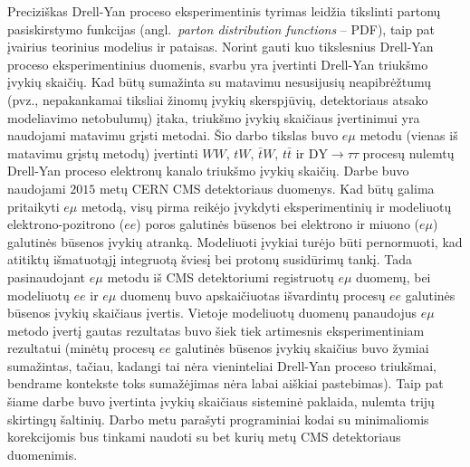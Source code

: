 \documentclass[a4paper, 12pt]{article}
\newcommand{\WW}{W\! W}
\newcommand{\DYtau}{\mathrm{DY} \! \rightarrow \! \tau\tau}
\begin{document}
Preciziškas Drell-Yan proceso eksperimentinis tyrimas leidžia tikslinti partonų pasiskirstymo funkcijas (angl.\ \textit{parton distribution functions} -- PDF), taip pat įvairius teorinius modelius ir pataisas. Norint gauti kuo tikslesnius Drell-Yan proceso eksperimentinius duomenis, svarbu yra įvertinti Drell-Yan triukšmo įvykių skaičių. Kad būtų sumažinta su matavimu nesusijusių neapibrėžtumų (pvz., nepakankamai tiksliai žinomų įvykių skerspjūvių, detektoriaus atsako modeliavimo netobulumų) įtaka, triukšmo įvykių skaičiaus įvertinimui yra naudojami matavimu grįsti metodai. Šio darbo tikslas buvo $e\mu$ metodu (vienas iš matavimu grįstų metodų) įvertinti $\WW$, $tW$, $\bar{t}W$, $t\bar{t}$ ir $\DYtau$ procesų nulemtų Drell-Yan proceso elektronų kanalo triukšmo įvykių skaičių. Darbe buvo naudojami $2015$ metų CERN CMS detektoriaus duomenys. Kad būtų galima pritaikyti $e\mu$ metodą, visų pirma reikėjo įvykdyti eksperimentinių ir modeliuotų elektrono-pozitrono ($ee$) poros galutinės būsenos bei elektrono ir miuono ($e\mu$) galutinės būsenos įvykių atranką. Modeliuoti įvykiai turėjo būti pernormuoti, kad atitiktų išmatuotąjį integruotą šviesį bei protonų susidūrimų tankį. Tada pasinaudojant $e\mu$ metodu iš CMS detektoriumi registruotų $e\mu$ duomenų, bei modeliuotų $ee$ ir $e\mu$ duomenų buvo apskaičiuotas išvardintų procesų $ee$ galutinės būsenos įvykių skaičiaus įvertis. Vietoje modeliuotų duomenų panaudojus $e\mu$ metodo įvertį gautas rezultatas buvo šiek tiek artimesnis eksperimentiniam rezultatui (minėtų procesų $ee$ galutinės būsenos įvykių skaičius buvo žymiai sumažintas, tačiau, kadangi tai nėra vieninteliai Drell-Yan proceso triukšmai, bendrame kontekste toks sumažėjimas nėra labai aiškiai pastebimas). Taip pat šiame darbe buvo įvertinta įvykių skaičiaus sisteminė paklaida, nulemta trijų skirtingų šaltinių. Darbo metu parašyti programiniai kodai su minimaliomis korekcijomis bus tinkami naudoti su bet kurių metų CMS detektoriaus duomenimis.

\clearpage
\end{document}
